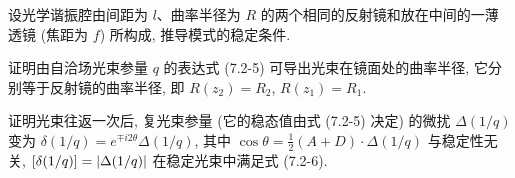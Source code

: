 \documentclass{note}
\begin{document}
\begin{exe}
    设光学谐振腔由间距为 $l$、曲率半径为 $R$ 的两个相同的反射镜和放在中间的一薄透镜 (焦距为 $f$) 所构成, 推导模式的稳定条件.
\end{exe}
\begin{sol}
    
\end{sol}

\begin{exe}
    证明由自洽场光束参量 $q$ 的表达式 (7.2-5) 可导出光束在镜面处的曲率半径, 它分别等于反射镜的曲率半径, 即 $R(z_2)=R_2$, $R(z_1)=R_1$.
\end{exe}
\begin{pf}
    
\end{pf}

\begin{exe}
    证明光束往返一次后, 复光束参量 (它的稳态值由式 (7.2-5) 决定) 的微扰 $\Delta(1/q)$ 变为 $\delta(1/q)=e^{\mp i2\theta}\Delta(1/q)$, 其中 $\cos\theta=\frac{1}{2}(A+D)\cdot\Delta(1/q)$ 与稳定性无关, $[\delta(1/q)]=\left\lvert\Delta(1/q)\right\rvert$ 在稳定光束中满足式 (7.2-6).
\end{exe}
\begin{pf}
    
\end{pf}
\ifx\allfiles\undefined
\end{document}

